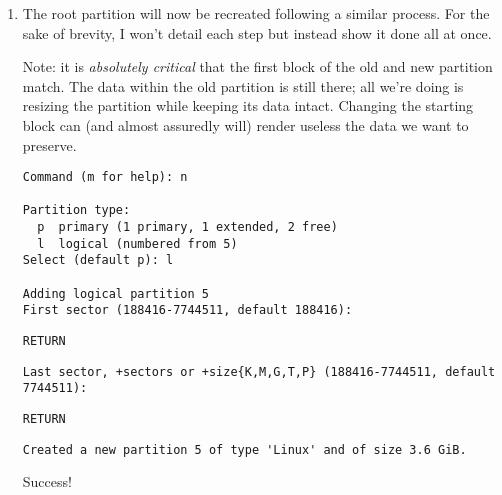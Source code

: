 \documentclass[12pt,letterpaper]{article}
\newcommand\kbd[1]{\textlangle\texttt{#1}\textrangle}
\newcommand\return{RETURN}
\begin{document}
\begin{enumerate}
\begin{lstlisting}
Partition type:
  p  primary (1 primary, 0 extended, 3 free)
  e  extended
Select (default p):
\end{lstlisting}
enter \lstinline{e},
\begin{lstlisting}
Select (default p): e
Partition number (2-4, default 2):
\end{lstlisting}
enter \lstinline{2},
\begin{lstlisting}
Partition number (2-4, default 2): 2
First sector (186368-7744511, default 186368):
\end{lstlisting}
press \kbd{\return} 
(or manually enter the number, make a mistake, and \emph{ruin everything}),
\begin{lstlisting}
Last sector, +sectors or +size{K,M,G,T,P} (186368-7744511, default 7744511):
\end{lstlisting}
press \kbd{\return}, which results in
\begin{lstlisting}
Created a new partition 2 of type 'Extended' and a size of 3.6 GiB.
\end{lstlisting}
The extended partition has now been created, but this time it occupies the disk space not taken up by the boot partition.

\item \label{item:root} The root partition will now be recreated following a similar process.  For the sake of brevity, I won't detail each step but instead show it done all at once.

Note: it is \emph{absolutely critical} that the first block of the old and new partition match.  The data within the old partition is still there; all we're doing is resizing the partition while keeping its data intact.  Changing the starting block can (and almost assuredly will) render useless the data we want to preserve.
\begin{lstlisting}
Command (m for help): n

Partition type:
  p  primary (1 primary, 1 extended, 2 free)
  l  logical (numbered from 5)
Select (default p): l

Adding logical partition 5
First sector (188416-7744511, default 188416):
\end{lstlisting}
\kbd{\return}
\begin{lstlisting}
Last sector, +sectors or +size{K,M,G,T,P} (188416-7744511, default 7744511):
\end{lstlisting}
\kbd{\return}
\begin{lstlisting}
Created a new partition 5 of type 'Linux' and of size 3.6 GiB.
\end{lstlisting}
Success!


\end{enumerate}
\end{document}
